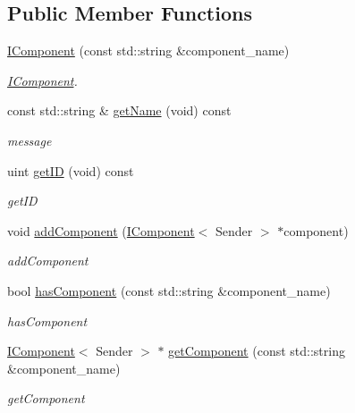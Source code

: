 \subsection*{Public Member Functions}
\begin{DoxyCompactItemize}
\item 
\hyperlink{classEngine_1_1IComponent_a7b5acbdb4786c772e6c83735cf5a2ad6}{I\+Component} (const std\+::string \&component\+\_\+name)
\begin{DoxyCompactList}\small\item\em \hyperlink{classEngine_1_1IComponent}{I\+Component}. \end{DoxyCompactList}\item 
const std\+::string \& \hyperlink{classEngine_1_1IComponent_addee40bd0de98ebcf4566d8b95968e05}{get\+Name} (void) const 
\begin{DoxyCompactList}\small\item\em message \end{DoxyCompactList}\item 
uint \hyperlink{classEngine_1_1IComponent_af35ea9d64e2151e4641f73500ec8d19b}{get\+I\+D} (void) const 
\begin{DoxyCompactList}\small\item\em get\+I\+D \end{DoxyCompactList}\item 
void \hyperlink{classEngine_1_1IComponent_aad832773ebaaefc426394d7d5b3fb5e7}{add\+Component} (\hyperlink{classEngine_1_1IComponent}{I\+Component}$<$ Sender $>$ $\ast$component)
\begin{DoxyCompactList}\small\item\em add\+Component \end{DoxyCompactList}\item 
bool \hyperlink{classEngine_1_1IComponent_ab6ff658b9114391269ffa3d9f1d57e10}{has\+Component} (const std\+::string \&component\+\_\+name)
\begin{DoxyCompactList}\small\item\em has\+Component \end{DoxyCompactList}\item 
\hyperlink{classEngine_1_1IComponent}{I\+Component}$<$ Sender $>$ $\ast$ \hyperlink{classEngine_1_1IComponent_ac33863a371723db7aef928986ff942e1}{get\+Component} (const std\+::string \&component\+\_\+name)
\begin{DoxyCompactList}\small\item\em get\+Component \end{DoxyCompactList}\item 

\end{DoxyCompactItemize}
